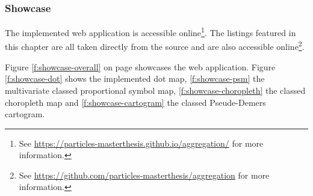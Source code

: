 \subsubsection{Showcase}
The implemented web application is accessible online\footnote{See \href{https://particles-masterthesis.github.io/aggregation/}{https://particles-masterthesis.github.io/aggregation/} for more information.}. The listings featured in this chapter are all taken directly from the source and are also accessible online\footnote{See \href{https://github.com/particles-masterthesis/aggregation}{https://github.com/particles-masterthesis/aggregation} for more information.}.

Figure \ref{f:showcase-overall} on page \pageref{f:showcase-overall} showcases the web application. Figure \ref{f:showcase-dot} shows the implemented dot map, \ref{f:showcase-psm} the multivariate classed proportional symbol map, \ref{f:showcase-choropleth} the classed choropleth map and \ref{f:showcase-cartogram} the classed Pseude-Demers cartogram.

